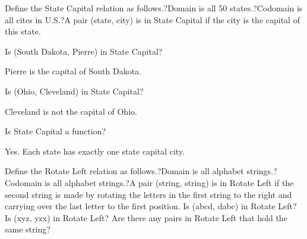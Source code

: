 \documentclass{ximera}
\begin{document}
\begin{question}

Define the State Capital relation as follows.?Domain is all 50 states.?Codomain is all cites in U.S.?A pair (state, city) is in State Capital if the city is the capital of this state.


Is (South Dakota, Pierre) in State Capital?
\begin{multipleChoice}
\end{multipleChoice}
\begin{feedback}
Pierre is the capital of South Dakota.
\end{feedback}


Is (Ohio, Cleveland) in State Capital?
\begin{multipleChoice}
\end{multipleChoice}
\begin{feedback}
Cleveland is not the capital of Ohio.
\end{feedback}


Is State Capital a function?
\begin{multipleChoice}
\end{multipleChoice}
\begin{feedback}
Yes. Each state has exactly one state capital city.
\end{feedback}

\end{question}




Define the Rotate Left relation as follows.?Domain is all alphabet strings.?Codomain is all alphabet strings.?A pair (string, string) is in Rotate Left if the second string is made by rotating the letters in the first string to the right and carrying over the last letter to the first position.
Is (abcd, dabc) in Rotate Left?
Is (xyz, yzx) in Rotate Left?
Are there any pairs in Rotate Left that hold the same string?
\end{document}
